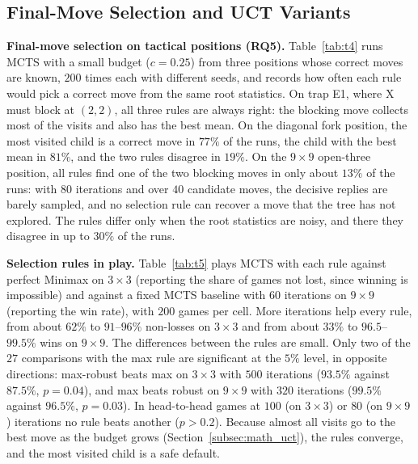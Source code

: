 \subsection{Final-Move Selection and UCT Variants}
\label{subsec:results_tv2}

\textbf{Final-move selection on tactical positions (RQ5).} Table~\ref{tab:t4} runs MCTS with a small budget ($c = 0.25$) from three positions whose correct moves are known, $200$ times each with different seeds, and records how often each rule would pick a correct move from the same root statistics. On trap E1, where X must block at $(2,2)$, all three rules are always right: the blocking move collects most of the visits and also has the best mean. On the diagonal fork position, the most visited child is a correct move in $77\%$ of the runs, the child with the best mean in $81\%$, and the two rules disagree in $19\%$. On the $9\times 9$ open-three position, all rules find one of the two blocking moves in only about $13\%$ of the runs: with $80$ iterations and over $40$ candidate moves, the decisive replies are barely sampled, and no selection rule can recover a move that the tree has not explored. The rules differ only when the root statistics are noisy, and there they disagree in up to $30\%$ of the runs.

\begin{table}[t]
\centering
\caption{T4: Percentage of $200$ seeds in which each final-move rule picks a correct move}
\label{tab:t4}

\end{table}

\textbf{Selection rules in play.} Table~\ref{tab:t5} plays MCTS with each rule against perfect Minimax on $3\times 3$ (reporting the share of games not lost, since winning is impossible) and against a fixed MCTS baseline with $60$ iterations on $9\times 9$ (reporting the win rate), with $200$ games per cell. More iterations help every rule, from about $62\%$ to $91$--$96\%$ non-losses on $3\times 3$ and from about $33\%$ to $96.5$--$99.5\%$ wins on $9\times 9$. The differences between the rules are small. Only two of the $27$ comparisons with the max rule are significant at the $5\%$ level, in opposite directions: max-robust beats max on $3\times 3$ with $500$ iterations ($93.5\%$ against $87.5\%$, $p = 0.04$), and max beats robust on $9\times 9$ with $320$ iterations ($99.5\%$ against $96.5\%$, $p = 0.03$). In head-to-head games at $100$ (on $3\times 3$) or $80$ (on $9\times 9$) iterations no rule beats another ($p > 0.2$). Because almost all visits go to the best move as the budget grows (Section~\ref{subsec:math_uct}), the rules converge, and the most visited child is a safe default.

